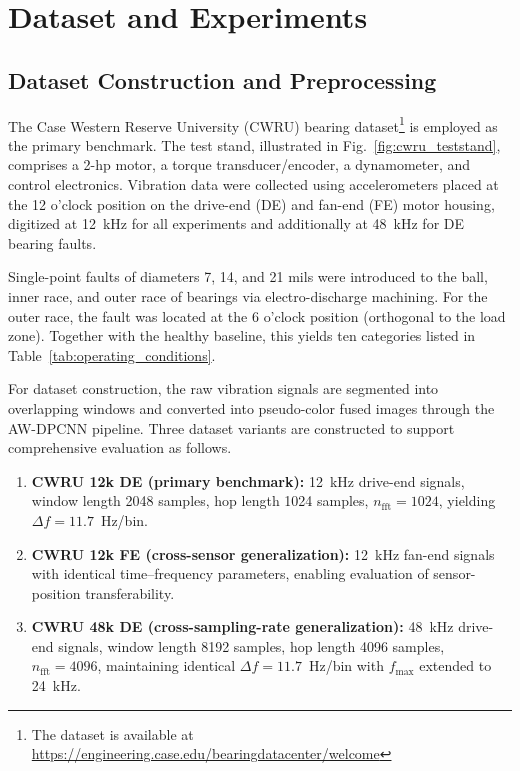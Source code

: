 \documentclass[pdflatex,sn-mathphys-num]{sn-jnl}
\theoremstyle{thmstyleone}%
\theoremstyle{thmstyletwo}%
\theoremstyle{thmstylethree}%
\begin{document}
\section{Dataset and Experiments}
\label{section4}

\subsection{Dataset Construction and Preprocessing}
\label{sec:dataset_preprocessing}

The Case Western Reserve University (CWRU) bearing dataset\footnote{The dataset is available at \url{https://engineering.case.edu/bearingdatacenter/welcome}} is employed as the primary benchmark. The test stand, illustrated in Fig.~\ref{fig:cwru_teststand}, comprises a 2-hp motor, a torque transducer/encoder, a dynamometer, and control electronics. Vibration data were collected using accelerometers placed at the 12 o'clock position on the drive-end (DE) and fan-end (FE) motor housing, digitized at 12~kHz for all experiments and additionally at 48~kHz for DE bearing faults.

Single-point faults of diameters 7, 14, and 21 mils were introduced to the ball, inner race, and outer race of bearings via electro-discharge machining. For the outer race, the fault was located at the 6 o'clock position (orthogonal to the load zone). Together with the healthy baseline, this yields ten categories listed in Table~\ref{tab:operating_conditions}.

For dataset construction, the raw vibration signals are segmented into overlapping windows and converted into pseudo-color fused images through the AW-DPCNN pipeline. Three dataset variants are constructed to support comprehensive evaluation as follows.

\begin{enumerate}
\item \textbf{CWRU 12k DE (primary benchmark):} 12~kHz drive-end signals, window length 2048 samples, hop length 1024 samples, $n_{\text{fft}}=1024$, yielding $\Delta f=11.7$~Hz/bin.
\item \textbf{CWRU 12k FE (cross-sensor generalization):} 12~kHz fan-end signals with identical time--frequency parameters, enabling evaluation of sensor-position transferability.
\item \textbf{CWRU 48k DE (cross-sampling-rate generalization):} 48~kHz drive-end signals, window length 8192 samples, hop length 4096 samples, $n_{\text{fft}}=4096$, maintaining identical $\Delta f=11.7$~Hz/bin with $f_{\max}$ extended to 24~kHz.
\end{enumerate}
\end{document}
